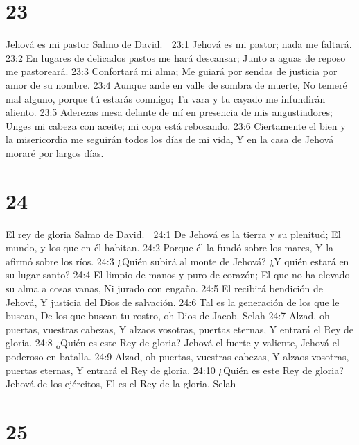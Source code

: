 \chapter{23}

Jehová es mi pastor 
Salmo de David. 

23:1 Jehová es mi pastor; nada me faltará. 
23:2 En lugares de delicados pastos me hará descansar; 
Junto a aguas de reposo me pastoreará. 
23:3 Confortará mi alma; 
Me guiará por sendas de justicia por amor de su nombre. 
23:4 Aunque ande en valle de sombra de muerte, 
No temeré mal alguno, porque tú estarás conmigo; 
Tu vara y tu cayado me infundirán aliento. 
23:5 Aderezas mesa delante de mí en presencia de mis angustiadores; 
Unges mi cabeza con aceite; mi copa está rebosando. 
23:6 Ciertamente el bien y la misericordia me seguirán todos los días de mi vida, 
Y en la casa de Jehová moraré por largos días. 

\chapter{24}

El rey de gloria 
Salmo de David. 

24:1 De Jehová es la tierra y su plenitud; 
El mundo, y los que en él habitan. 
24:2 Porque él la fundó sobre los mares, 
Y la afirmó sobre los ríos. 
24:3 ¿Quién subirá al monte de Jehová? 
¿Y quién estará en su lugar santo? 
24:4 El limpio de manos y puro de corazón; 
El que no ha elevado su alma a cosas vanas, 
Ni jurado con engaño. 
24:5 El recibirá bendición de Jehová, 
Y justicia del Dios de salvación. 
24:6 Tal es la generación de los que le buscan, 
De los que buscan tu rostro, oh Dios de Jacob. Selah 
24:7 Alzad, oh puertas, vuestras cabezas, 
Y alzaos vosotras, puertas eternas, 
Y entrará el Rey de gloria. 
24:8 ¿Quién es este Rey de gloria? 
Jehová el fuerte y valiente, 
Jehová el poderoso en batalla. 
24:9 Alzad, oh puertas, vuestras cabezas, 
Y alzaos vosotras, puertas eternas, 
Y entrará el Rey de gloria. 
24:10 ¿Quién es este Rey de gloria? 
Jehová de los ejércitos, 
El es el Rey de la gloria. Selah 

\chapter{25}

